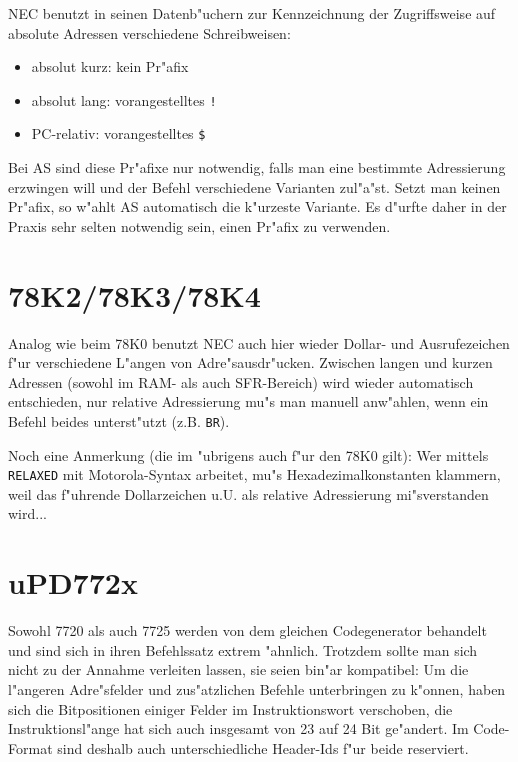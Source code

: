\documentclass[12pt,a4paper,twoside]{report}
\newcommand{\asname}{AS}
\begin{document}
NEC benutzt in seinen Datenb"uchern zur Kennzeichnung der Zugriffsweise
auf absolute Adressen verschiedene Schreibweisen:
\begin{itemize}
\item{absolut kurz: kein Pr"afix}
\item{absolut lang: vorangestelltes \verb"!"}
\item{PC-relativ: vorangestelltes \verb"$"}
\end{itemize}
Bei \asname{} sind diese Pr"afixe nur notwendig, falls man eine bestimmte
Adressierung erzwingen will und der Befehl verschiedene Varianten
zul"a"st.  Setzt man keinen Pr"afix, so w"ahlt \asname{} automatisch die
k"urzeste Variante.  Es d"urfte daher in der Praxis sehr selten
notwendig sein, einen Pr"afix zu verwenden.


\section{78K2/78K3/78K4}
\label{78K234Spec}

Analog wie beim 78K0 benutzt NEC auch hier wieder Dollar- und
Ausrufezeichen f"ur verschiedene L"angen von Adre"sausdr"ucken.
Zwischen langen und kurzen Adressen (sowohl im RAM- als auch
SFR-Bereich) wird wieder automatisch entschieden, nur relative
Adressierung mu"s man manuell anw"ahlen, wenn ein Befehl beides
unterst"utzt (z.B. {\tt BR}).

Noch eine Anmerkung (die im "ubrigens auch f"ur den 78K0 gilt): Wer
mittels {\tt RELAXED} mit Motorola-Syntax arbeitet, mu"s
Hexadezimalkonstanten klammern, weil das f"uhrende Dollarzeichen u.U. als
relative Adressierung mi"sverstanden wird...


\section{uPD772x}

Sowohl 7720 als auch 7725 werden von dem gleichen Codegenerator behandelt
und sind sich in ihren Befehlssatz extrem "ahnlich.  Trotzdem sollte man
sich nicht zu der Annahme verleiten lassen, sie seien bin"ar kompatibel:
Um die l"angeren Adre"sfelder und zus"atzlichen Befehle unterbringen zu
k"onnen, haben sich die Bitpositionen einiger Felder im Instruktionswort
verschoben, die Instruktionsl"ange hat sich auch insgesamt von 23 auf 24
Bit ge"andert.  Im Code-Format sind deshalb auch unterschiedliche
Header-Ids f"ur beide reserviert.
\end{document}

